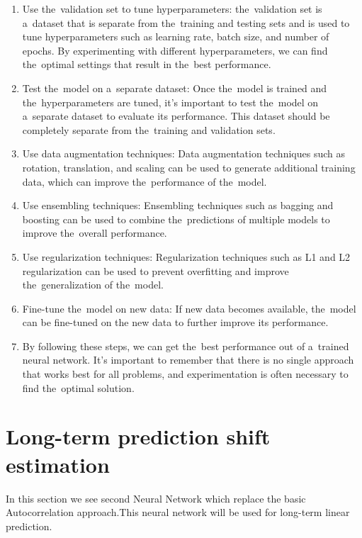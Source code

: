         \begin{enumerate}
            \item Use the~validation set to tune hyperparameters: the~validation set is a~dataset that is separate
            from the~training and testing sets and is used to tune hyperparameters such as learning rate, batch size,
            and number of epochs. By experimenting with different hyperparameters, we can find the~optimal settings
            that result in the~best performance.
            \item Test the~model on a~separate dataset: Once the~model is trained and the~hyperparameters are tuned,
            it's important to test the~model on a~separate dataset to evaluate its performance. This dataset should be
            completely separate from the~training and validation sets.
            \item Use data augmentation techniques: Data augmentation techniques such as rotation, translation, and
            scaling can be used to generate additional training data, which can improve the~performance of the~model.
            \item Use ensembling techniques: Ensembling techniques such as bagging and boosting can be used to
            combine the~predictions of multiple models to improve the~overall performance.
            \item Use regularization techniques: Regularization techniques such as L1 and L2 regularization
            can be used to prevent overfitting and improve the~generalization of the~model.
            \item Fine-tune the~model on new data: If new data becomes available, the~model can be fine-tuned on the
            new data to further improve its performance.
            \item By following these steps, we can get the~best performance out of a~trained neural network.
            It's important to remember that there is no single approach that works best for all problems, and
            experimentation is often necessary to find the~optimal solution.
        \end{enumerate}
    \section{Long-term prediction shift estimation}\label{sec:shiftcalc}
    In this section we see second Neural Network which replace the basic Autocorrelation approach.This neural network will be used for long-term linear prediction.
